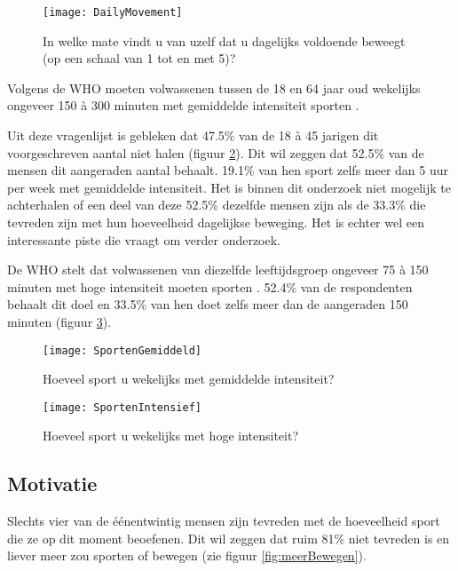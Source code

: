 \begin{figure}
    \caption[In welke mate vindt u van uzelf dat u dagelijks voldoende beweegt?]{In welke mate vindt u van uzelf dat u dagelijks voldoende beweegt (op een schaal van 1 tot en met 5)?}
    \texttt{[image: DailyMovement]}
    \label{fig:dagelijkseBeweging}
\end{figure}

Volgens de WHO moeten volwassenen tussen de 18 en 64 jaar oud wekelijks ongeveer 150 à 300 minuten met gemiddelde intensiteit sporten \autocite{Bull2020}.

Uit deze vragenlijst is gebleken dat 47.5\% van de 18 à 45 jarigen dit voorgeschreven aantal niet halen (figuur \ref{fig:gemiddeldSporten}). Dit wil zeggen dat 52.5\% van de mensen dit aangeraden aantal behaalt. 19.1\% van hen sport zelfs meer dan 5 uur per week met gemiddelde intensiteit. Het is binnen dit onderzoek niet mogelijk te achterhalen of een deel van deze 52.5\% dezelfde mensen zijn als de 33.3\% die tevreden zijn met hun hoeveelheid dagelijkse beweging. Het is echter wel een interessante piste die vraagt om verder onderzoek.

De WHO stelt dat volwassenen van diezelfde leeftijdsgroep ongeveer 75 à 150 minuten met hoge intensiteit moeten sporten \autocite{Bull2020}.
52.4\% van de respondenten behaalt dit doel en 33.5\% van hen doet zelfs meer dan de aangeraden 150 minuten (figuur \ref{fig:intensiefSporten}).

\begin{figure}[h]
    \caption[Hoeveel sport u wekelijks met gemiddelde intensiteit?]{Hoeveel sport u wekelijks met gemiddelde intensiteit?}
    \texttt{[image: SportenGemiddeld]}
    \label{fig:gemiddeldSporten}
\end{figure}

\begin{figure}[h]
    \caption[Hoeveel sport u wekelijks met hoge intensiteit?]{Hoeveel sport u wekelijks met hoge intensiteit?}
    \texttt{[image: SportenIntensief]}
    \label{fig:intensiefSporten}
\end{figure}

\subsection{Motivatie}

Slechts vier van de éénentwintig mensen zijn tevreden met de hoeveelheid sport die ze op dit moment beoefenen. Dit wil zeggen dat ruim 81\% niet tevreden is en liever meer zou sporten of bewegen (zie figuur \ref{fig:meerBewegen}).


